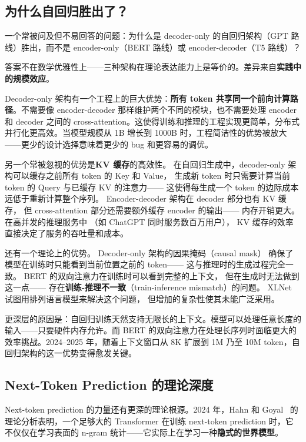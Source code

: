 \subsection{为什么自回归胜出了？}

一个常被问及但不易回答的问题：为什么是 decoder-only 的自回归架构（GPT 路线）胜出，而不是 encoder-only（BERT 路线）或 encoder-decoder（T5 路线）？

答案不在数学优雅性上——三种架构在理论表达能力上是等价的。差异来自\textbf{实践中的规模效应}。

Decoder-only 架构有一个工程上的巨大优势：\textbf{所有 token 共享同一个前向计算路径}。不需要像 encoder-decoder 那样维护两个不同的模块，也不需要处理 encoder 和 decoder 之间的 cross-attention。这使得训练和推理的工程实现更简单，分布式并行化更高效。当模型规模从 1B 增长到 1000B 时，工程简洁性的优势被放大——更少的设计选择意味着更少的 bug 和更容易的调优。

另一个常被忽视的优势是\textbf{KV 缓存}的高效性。
在自回归生成中，decoder-only 架构可以缓存之前所有 token 的 Key 和 Value，
生成新 token 时只需要计算当前 token 的 Query 与已缓存 KV 的注意力——
这使得每生成一个 token 的边际成本远低于重新计算整个序列。
Encoder-decoder 架构在 decoder 部分也有 KV 缓存，
但 cross-attention 部分还需要额外缓存 encoder 的输出——
内存开销更大。
在高并发的推理服务中
（如 ChatGPT 同时服务数百万用户），
KV 缓存的效率直接决定了服务的吞吐量和成本。

还有一个理论上的优势。
Decoder-only 架构的因果掩码（causal mask）
确保了模型在训练时只能看到当前位置之前的 token——
这与推理时的生成过程完全一致。
BERT 的双向注意力在训练时可以看到完整的上下文，
但在生成时无法做到这一点——
存在\textbf{训练-推理不一致}（train-inference mismatch）的问题。
XLNet~\cite{yang2019xlnet} 试图用排列语言模型来解决这个问题，
但增加的复杂性使其未能广泛采用。

更深层的原因是：自回归训练天然支持无限长的上下文。模型可以处理任意长度的输入——只要硬件内存允许。而 BERT 的双向注意力在处理长序列时面临更大的效率挑战。2024--2025 年，随着上下文窗口从 8K 扩展到 1M 乃至 10M token，自回归架构的这一优势变得愈发关键。

\subsection{Next-Token Prediction 的理论深度}

Next-token prediction 的力量还有更深的理论根源。2024 年，Hahn 和 Goyal~\cite{hahn2024theory} 的理论分析表明，一个足够大的 Transformer 在训练 next-token prediction 时，它不仅仅在学习表面的 n-gram 统计——它实际上在学习一种\textbf{隐式的世界模型}。

